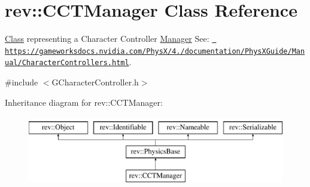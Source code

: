 \hypertarget{classrev_1_1_c_c_t_manager}{}\section{rev\+::C\+C\+T\+Manager Class Reference}
\label{classrev_1_1_c_c_t_manager}


\mbox{\hyperlink{struct_class}{Class}} representing a Character Controller \mbox{\hyperlink{classrev_1_1_manager}{Manager}} See\+: \href{https://gameworksdocs.nvidia.com/PhysX/4.0/documentation/PhysXGuide/Manual/CharacterControllers.html}{\texttt{ https\+://gameworksdocs.\+nvidia.\+com/\+Phys\+X/4./documentation/\+Phys\+X\+Guide/\+Manual/\+Character\+Controllers.\+html}}.  




{\ttfamily \#include $<$G\+Character\+Controller.\+h$>$}

Inheritance diagram for rev\+::C\+C\+T\+Manager\+:\begin{figure}[H]
\begin{center}
\leavevmode
\includegraphics[height=3.000000cm]{classrev_1_1_c_c_t_manager}
\end{center}
\end{figure}
